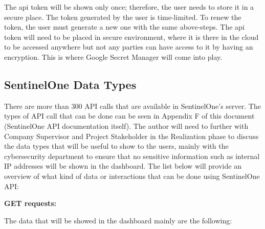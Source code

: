 The \acrshort{api} token will be shown only once; therefore, the user needs to store it in a secure place.
The token generated by the user is time-limited. To renew the token, the user must generate a new one with the same above-steps. The
\acrshort{api} token will need to be placed in secure environment, where it is there in the cloud to be accessed anywhere but not any
parties can have access to it by having an encryption. This is where Google Secret Manager will come into play.

\subsection{SentinelOne Data Types}

There are more than 300 API calls that are available in SentinelOne's server. The types of API call that can be done can be seen in
Appendix F of this document (SentinelOne API documentation itself). The author will need to further with Company Supervisor and
Project Stakeholder in the Realization phase to discuss the data types that will be useful to show to the users, mainly with the
cybersecurity department to ensure that no sensitive information such as internal IP addresses will be shown in the dashboard.
The list below will provide an overview of what kind of data or interactions that can be done using SentinelOne API:

\textbf{GET requests:}

The data that will be showed in the dashboard mainly are the following:

